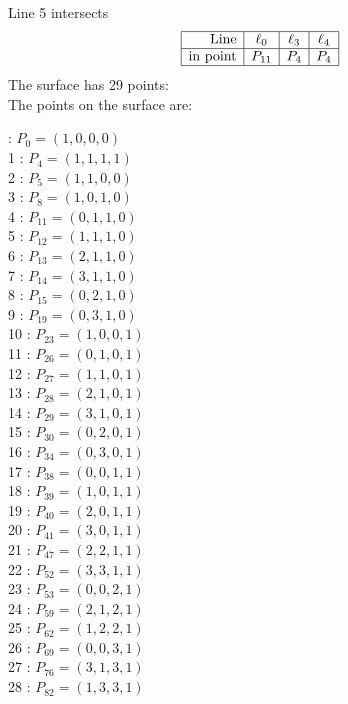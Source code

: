 \documentclass{article}
\begin{document}
{$$$$
Line 5 intersects 
$$
\begin{array}{|r*{3}{|c}|}
\hline
\mbox{Line}  & \ell_{0} & \ell_{3} & \ell_{4}\\
\hline
\mbox{in point}  & P_{11} & P_{4} & P_{4}\\
\hline
\end{array}
$$
The surface has 29 points:\\
The points on the surface are:\\
\begin{multicols}{3}
 : $P_{0}=( 1, 0, 0, 0 )$\\
1 : $P_{4}=( 1, 1, 1, 1 )$\\
2 : $P_{5}=( 1, 1, 0, 0 )$\\
3 : $P_{8}=( 1, 0, 1, 0 )$\\
4 : $P_{11}=( 0, 1, 1, 0 )$\\
5 : $P_{12}=( 1, 1, 1, 0 )$\\
6 : $P_{13}=( 2, 1, 1, 0 )$\\
7 : $P_{14}=( 3, 1, 1, 0 )$\\
8 : $P_{15}=( 0, 2, 1, 0 )$\\
9 : $P_{19}=( 0, 3, 1, 0 )$\\
10 : $P_{23}=( 1, 0, 0, 1 )$\\
11 : $P_{26}=( 0, 1, 0, 1 )$\\
12 : $P_{27}=( 1, 1, 0, 1 )$\\
13 : $P_{28}=( 2, 1, 0, 1 )$\\
14 : $P_{29}=( 3, 1, 0, 1 )$\\
15 : $P_{30}=( 0, 2, 0, 1 )$\\
16 : $P_{34}=( 0, 3, 0, 1 )$\\
17 : $P_{38}=( 0, 0, 1, 1 )$\\
18 : $P_{39}=( 1, 0, 1, 1 )$\\
19 : $P_{40}=( 2, 0, 1, 1 )$\\
20 : $P_{41}=( 3, 0, 1, 1 )$\\
21 : $P_{47}=( 2, 2, 1, 1 )$\\
22 : $P_{52}=( 3, 3, 1, 1 )$\\
23 : $P_{53}=( 0, 0, 2, 1 )$\\
24 : $P_{59}=( 2, 1, 2, 1 )$\\
25 : $P_{62}=( 1, 2, 2, 1 )$\\
26 : $P_{69}=( 0, 0, 3, 1 )$\\
27 : $P_{76}=( 3, 1, 3, 1 )$\\
28 : $P_{82}=( 1, 3, 3, 1 )$\\
\end{multicols}


}
\end{document}
